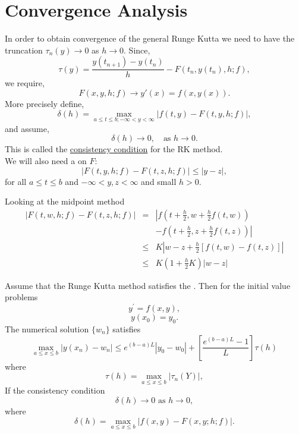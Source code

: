 \section{Convergence Analysis}
In order to obtain convergence of the general Runge Kutta we need to have the truncation
$\tau_n(y)\rightarrow0$ as $h \rightarrow 0$.  Since,
\[\tau(y)=\frac{y(t_{n+1})-y(t_n)}{h}-F(t_n,y(t_n),h;f), \]
we require,
\[F(x,y,h;f)\rightarrow y{'}(x)=f(x,y(x)). \]
More precisely define,
\[\delta(h)= \max_{a\leq t \leq b ; -\infty < y <\infty} |f(t,y)-F(t,y,h;f)|, \]
and assume,
\begin{equation}
\label{C}
 \delta(h) \rightarrow 0, \ \ \ \mbox{ as } h \rightarrow 0.
 \end{equation}
This is called the \underline{consistency condition} for the RK method.\\
We will also need a  on $F$:
\begin{equation}
\label{L}
|F(t,y,h;f)-F(t,z,h;f)|\leq |y-z|,
 \end{equation}
for all $a\leq t \leq b$ and $-\infty <y,z < \infty $ and small $h >0$.
\begin{example}
Looking at the midpoint method
\begin{eqnarray*}
|F(t,w,h;f)-F(t,z,h;f)| &=&
\left|f(t+\frac{h}{2},w+\frac{h}{2}f(t,w)) \right. \\
& & \left. -f(t+\frac{h}{2},z+\frac{h}{2}f(t,z) )
 \right|\\
&\leq& K \left| w-z +\frac{h}{2}[f(t,w)-f(t,z) ]\right|\\
&\leq &	K \left(1 +\frac{h}{2}K \right)|w-z|
\end{eqnarray*}
\end{example}
\begin{theorem}
Assume that the Runge Kutta method satisfies the . Then
for the initial value problems
\[ y^{'}=f(x,y),\]
\[ y(x_0)=y_0. \]
The numerical solution $\{ w_n\}$ satisfies
\[ \max_{a\leq x\leq b}|y(x_n)-w_n| \leq e^{(b-a)L}|y_0-w_0|+\left[\frac{e^{(b-a)L}-1}{L} \right]\tau(h) \]
where
\[\tau(h) = \max_{a\leq x\leq b}|\tau_n(Y)|,\]
If the consistency condition 
\[ \delta(h) \rightarrow 0 \mbox{ as  } h\rightarrow 0, \]
where
\[\delta(h) = \max_{a \leq x \leq b}|f(x,y)-F(x,y;h;f)|. \]

\end{theorem}
